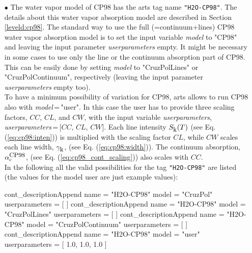 \begin{itemize}
\item[$\bullet$] The water vapor model of CP98 \citep{cruzpol:98}
     has the arts tag name {\tt "H2O-CP98"}. The details about this water 
     vapor absorption model are described in Section \ref{leveld:cp98}. 
     The standard way to use the full (=continuum+lines) CP98 water 
     vapor absorption model is to set the input variable {\it model} 
     to "CP98" and leaving the input parameter {\it userparameters} empty. 
     It might be necessary in some cases to use only the line or the 
     continuum absorption part of CP98. This can be easily done 
     by setting {\it model} to "CruzPolLines" or "CruzPolContinuum", 
     respectively (leaving the input parameter {\it userparameters} 
     empty too).\\ To have a minimum possibility of variation for CP98, 
     arts allows to run CP98 also with {\it model}\,=\,"user". 
     In this case the user has to provide three scaling factors,  
     $CC$, $CL$, and $CW$, with the input variable {\it userparameters}, 
     {\it userparameters}\,=\,$[$$CC$, $CL$, $CW$$]$. 
     Each line intensity $S_{\mbox{\rm \small k}}(T)$ (see Eq. (\ref{eq:cp98:inten})) 
     is multiplied with the scaling factor $CL$, while $CW$ scales 
     each line width, $\gamma_{\mbox{\rm \small k}}$, (see Eq. (\ref{eq:cp98:width})). 
     The continuum absorption, $\alpha^{\mbox{\rm \small CP98}}_{\rm c}$, 
     (see Eq. (\ref{eq:cp98_cont_scaling})) also scales with $CC$.\\
     In the following all the valid possibilities for the
     tag {\tt "H2O-CP98"} are listed (the values for the 
     model user are just example values): 
\begin{code}
cont_descriptionAppend{
    name           = "H2O-CP98"
    model          = "CruzPol"
    userparameters = [ ]
}
cont_descriptionAppend{
    name           = "H2O-CP98"
    model          = "CruzPolLines"
    userparameters = [ ]
}
cont_descriptionAppend{
    name           = "H2O-CP98"
    model          = "CruzPolContinuum"
    userparameters = [ ]
}
cont_descriptionAppend{
    name           = "H2O-CP98"
    model          = "user"
    userparameters = [ 1.0, 1.0, 1.0 ]
}
\end{code}


\end{itemize}
